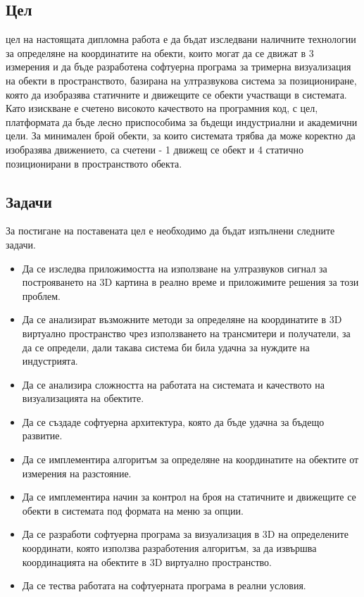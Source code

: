 \subsection{Цел}
 цел на настоящата дипломна работа е да бъдат изследвани наличните технологии за определяне на координатите на обекти, които могат да се движат в 3 измерения и да бъде разработена софтуерна програма за тримерна визуализация на обекти в пространството, базирана на ултразвукова система за позициониране, която да изобразява статичните и движещите се обекти участващи в системата. Като изискване е счетено високото качеството на програмния код, с цел, платформата да бъде лесно приспособима за бъдещи индустриални и академични цели. За минимален брой обекти, за които системата трябва да може коректно да изобразява движението, са счетени - 1 движещ се обект и 4 статично позиционирани в пространството обекта. 

\subsection{Задачи}
За постигане на поставената цел е необходимо да бъдат изпълнени следните задачи.

\begin{itemize}
    \item Да се изследва приложимостта на използване на ултразвуков сигнал за построяването на 3D картина в реално време и приложимите решения за този проблем.
      
    \item Да се анализират възможните методи за определяне на координатите в 3D виртуално пространство чрез използването на трансмитери и получатели, за да се определи, дали такава система би била удачна за нуждите на индустрията.
    
    \item Да се анализира сложността на работата на системата и качеството на визуализацията на обектите.
    
    \item Да се създаде софтуерна архитектура, която да бъде удачна за бъдещо развитие. 
    
    \item Да се имплементира алгоритъм за определяне на координатите на обектите от измерения на разстояние.
    
    \item Да се имплементира начин за контрол на броя на статичните и движещите се обекти в системата под формата на меню за опции.
    
    \item Да се разработи софтуерна програма за визуализация в 3D на определените координати, която използва разработения алгоритъм, за да извършва координацията на обектите в 3D виртуално пространство.
    
    \item Да се тества работата на софтуерната програма в реални условия.

\end{itemize}